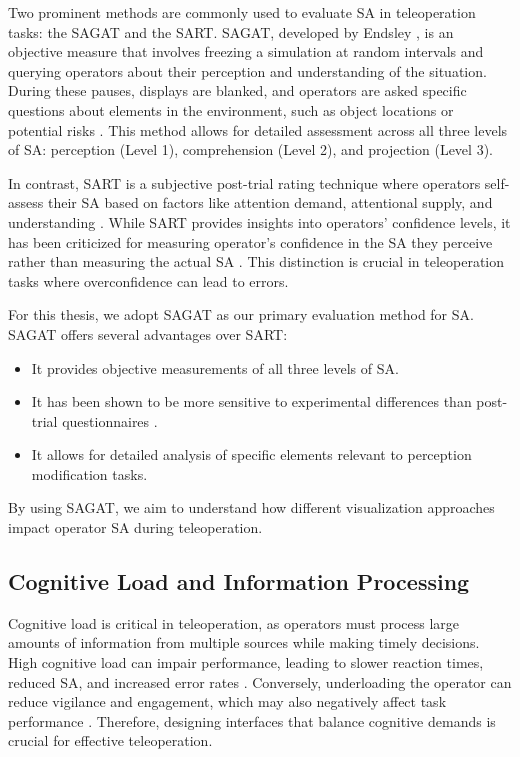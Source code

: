 Two prominent methods are commonly used to evaluate \ac{SA} in teleoperation tasks: the \ac{SAGAT} and the \ac{SART}. \ac{SAGAT}, developed by Endsley \cite{endsley1988sagat}, is an objective measure that involves freezing a simulation at random intervals and querying operators about their perception and understanding of the situation. During these pauses, displays are blanked, and operators are asked specific questions about elements in the environment, such as object locations or potential risks \cite{endsley2000direct}. This method allows for detailed assessment across all three levels of \ac{SA}: perception (Level 1), comprehension (Level 2), and projection (Level 3).

In contrast, SART is a subjective post-trial rating technique where operators self-assess their \ac{SA} based on factors like attention demand, attentional supply, and understanding \cite{taylor1990sart}. While \ac{SART} provides insights into operators' confidence levels, it has been criticized for measuring operator's confidence in the \ac{SA} they perceive rather than measuring the actual \ac{SA} \cite{endsley2020review}. This distinction is crucial in teleoperation tasks where overconfidence can lead to errors.

For this thesis, we adopt \ac{SAGAT} as our primary evaluation method for \ac{SA}. \ac{SAGAT} offers several advantages over SART:
\begin{itemize}
    \item It provides objective measurements of all three levels of \ac{SA}.
    \item It has been shown to be more sensitive to experimental differences than post-trial questionnaires \cite{endsley2000direct}.
    \item It allows for detailed analysis of specific elements relevant to perception modification tasks.
\end{itemize}
By using \ac{SAGAT}, we aim to understand how different visualization approaches impact operator \ac{SA} during teleoperation.

\subsection{Cognitive Load and Information Processing}\label{subsection:cognitiveload}
Cognitive load is critical in teleoperation, as operators must process large amounts of information from multiple sources while making timely decisions. High cognitive load can impair performance, leading to slower reaction times, reduced \ac{SA}, and increased error rates \cite{Kettwich}. Conversely, underloading the operator can reduce vigilance and engagement, which may also negatively affect task performance \cite{mutzenich2021updating}. Therefore, designing interfaces that balance cognitive demands is crucial for effective teleoperation.

